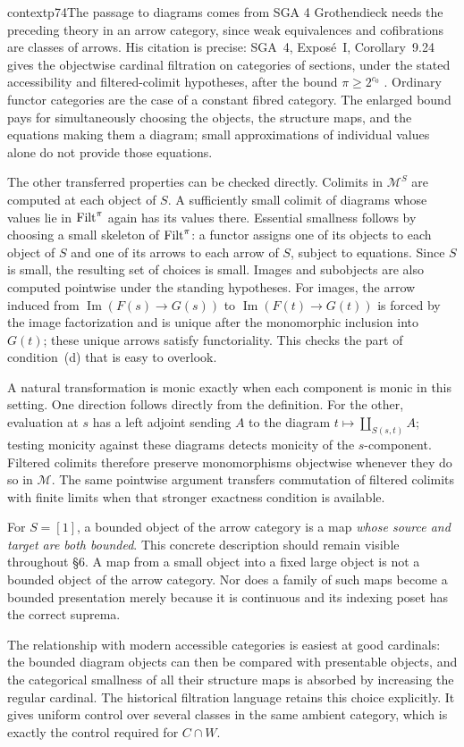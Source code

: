 \begin{dcomment}{context}{p74}{The passage to diagrams comes from SGA 4}
Grothendieck needs the preceding theory in an arrow category, since weak equivalences and cofibrations are classes of arrows. His citation is precise: SGA~4, Expos\'e~I, Corollary~9.24 gives the objectwise cardinal filtration on categories of sections, under the stated accessibility and filtered-colimit hypotheses, after the bound $\pi\geq2^{c_0}$ \citep[Expos\'e~I, 9.22--9.24]{SGA4I1972}. Ordinary functor categories are the case of a constant fibred category. The enlarged bound pays for simultaneously choosing the objects, the structure maps, and the equations making them a diagram; small approximations of individual values alone do not provide those equations.

The other transferred properties can be checked directly. Colimits in $\mathcal M^S$ are computed at each object of $S$. A sufficiently small colimit of diagrams whose values lie in $\mathrm{Filt}^\pi$ again has its values there. Essential smallness follows by choosing a small skeleton of $\mathrm{Filt}^\pi$: a functor assigns one of its objects to each object of $S$ and one of its arrows to each arrow of $S$, subject to equations. Since $S$ is small, the resulting set of choices is small. Images and subobjects are also computed pointwise under the standing hypotheses. For images, the arrow induced from $\operatorname{Im}(F(s)\to G(s))$ to $\operatorname{Im}(F(t)\to G(t))$ is forced by the image factorization and is unique after the monomorphic inclusion into $G(t)$; these unique arrows satisfy functoriality. This checks the part of condition~(d) that is easy to overlook.

A natural transformation is monic exactly when each component is monic in this setting. One direction follows directly from the definition. For the other, evaluation at $s$ has a left adjoint sending $A$ to the diagram $t\mapsto\coprod_{S(s,t)}A$; testing monicity against these diagrams detects monicity of the $s$-component. Filtered colimits therefore preserve monomorphisms objectwise whenever they do so in $\mathcal M$. The same pointwise argument transfers commutation of filtered colimits with finite limits when that stronger exactness condition is available.

For $S=[1]$, a bounded object of the arrow category is a map \emph{whose source and target are both bounded}. This concrete description should remain visible throughout \S6. A map from a small object into a fixed large object is not a bounded object of the arrow category. Nor does a family of such maps become a bounded presentation merely because it is continuous and its indexing poset has the correct suprema.

The relationship with modern accessible categories is easiest at good cardinals: the bounded diagram objects can then be compared with presentable objects, and the categorical smallness of all their structure maps is absorbed by increasing the regular cardinal. The historical filtration language retains this choice explicitly. It gives uniform control over several classes in the same ambient category, which is exactly the control required for $C\cap W$.
\end{dcomment}


